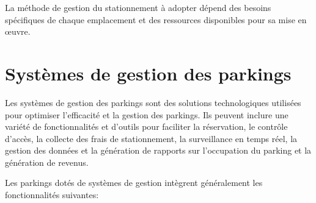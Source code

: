 La méthode de gestion du stationnement à adopter dépend des besoins spécifiques de chaque emplacement et des ressources disponibles pour sa mise en œuvre.

\section{Systèmes de gestion des parkings}

Les systèmes de gestion des parkings sont des solutions technologiques utilisées pour optimiser l'efficacité et la gestion des parkings. Ils peuvent inclure une variété de fonctionnalités et d'outils pour faciliter la réservation, le contrôle d'accès, la collecte des frais de stationnement, la surveillance en temps réel, la gestion des données et la génération de rapports sur l’occupation du parking et la génération de revenus. 

Les parkings dotés de systèmes de gestion intègrent généralement les fonctionnalités suivantes:

